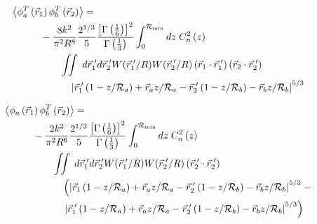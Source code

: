 \begin{equation}\label{eqn:tphase_n5}
\begin{aligned}
&\left\langle \phi^{T}_{a}\left(\vec{r}_{1}\right) \phi^{T}_{b}\left(\vec{r}_{2}\right)\right\rangle = \\
&\quad\quad\quad
-\frac{8k^{2}}{\pi^{2}R^{8}} 
\frac{2^{1/3}}{5}\frac{\left[\Gamma\left(\frac{1}{6}\right)\right]^{2}}{\Gamma\left(\frac{1}{3}\right)} 
\int_{0}^{\mathcal{R}_{\rm min}} dz\;C_{n}^{2}\left(z\right) \\
&\quad\quad\quad\quad\quad
\iint \; d\vec{r}^{\;\prime}_{1}d\vec{r}^{\;\prime}_{2} W(\vec{r}^{\;\prime}_{1}/R) W(\vec{r}^{\;\prime}_{2}/R)
\left(\vec{r}_{1} \cdot \vec{r}^{\;\prime}_{1}\right)
\left(\vec{r}_{2} \cdot \vec{r}^{\;\prime}_{2}\right)
\\
&\quad\quad\quad\quad\quad\quad
\left\vert \vec{r}^{\;\prime}_{1}\left(1-z/\mathcal{R}_{a}\right) + \vec{r}_{a} z/\mathcal{R}_{a} - 
 \vec{r}^{\;\prime}_{2}\left(1-z/\mathcal{R}_{b}\right) - \vec{r}_{b} z/\mathcal{R}_{b}\right\vert^{5/3}
\end{aligned}
\end{equation}

\begin{equation}\label{eqn:tprphase_n5}
\begin{aligned}
&\left\langle \phi_{a}\left(\vec{r}_{1}\right) \phi^{T}_{b}\left(\vec{r}_{2}\right)\right\rangle = \\
&\quad\quad\quad
-\frac{2k^{2}}{\pi^{2}R^{6}} 
\frac{2^{1/3}}{5}\frac{\left[\Gamma\left(\frac{1}{6}\right)\right]^{2}}{\Gamma\left(\frac{1}{3}\right)} 
\int_{0}^{\mathcal{R}_{\rm min}} dz\;C_{n}^{2}\left(z\right) \\
&\quad\quad\quad\quad\quad
\iint  \; d\vec{r}^{\;\prime}_{1}d\vec{r}^{\;\prime}_{2} W(\vec{r}^{\;\prime}_{1}/R) W(\vec{r}^{\;\prime}_{2}/R)
\left(\vec{r}^{\;\prime}_{2} \cdot \vec{r}^{\;\prime}_{2}\right)
\\
&\quad\quad\quad\quad\quad\quad
\left(
\left\vert \vec{r}_{1}\left(1-z/\mathcal{R}_{a}\right) + \vec{r}_{a} z/\mathcal{R}_{a} - \vec{r}^{\;\prime}_{2}\left(1-z/\mathcal{R}_{b}\right) - \vec{r}_{b} z/\mathcal{R}_{b}\right\vert^{5/3}
\right. -
\\
&\quad\quad\quad\quad\quad\quad
\left.
\left\vert \vec{r}^{\;\prime}_{1}\left(1-z/\mathcal{R}_{a}\right) + \vec{r}_{a} z/\mathcal{R}_{a} - 
 \vec{r}^{\;\prime}_{2}\left(1-z/\mathcal{R}_{b}\right) - \vec{r}_{b} z/\mathcal{R}_{b}\right\vert^{5/3}
\right)
\end{aligned}
\end{equation}


